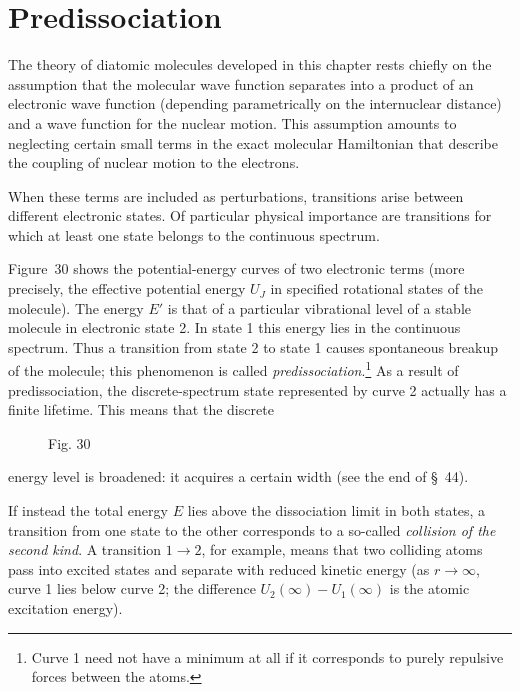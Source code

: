 \section{Predissociation}

The theory of diatomic molecules developed in this chapter rests chiefly on the assumption that the molecular wave function separates into a product of an electronic wave function (depending parametrically on the internuclear distance) and a wave function for the nuclear motion. This assumption amounts to neglecting certain small terms in the exact molecular Hamiltonian that describe the coupling of nuclear motion to the electrons.

When these terms are included as perturbations, transitions arise between different electronic states. Of particular physical importance are transitions for which at least one state belongs to the continuous spectrum.

Figure~30 shows the potential-energy curves of two electronic terms (more precisely, the effective potential energy $U_J$ in specified rotational states of the molecule). The energy $E'$ is that of a particular vibrational level of a stable molecule in electronic state 2. In state 1 this energy lies in the continuous spectrum. Thus a transition from state 2 to state 1 causes spontaneous breakup of the molecule; this phenomenon is called \emph{predissociation}.\footnote{Curve 1 need not have a minimum at all if it corresponds to purely repulsive forces between the atoms.} As a result of predissociation, the discrete-spectrum state represented by curve 2 actually has a finite lifetime. This means that the discrete

\begin{figure}[ht]
\centering
{}
\caption*{Fig. 30}
\end{figure}

energy level is broadened: it acquires a certain width (see the end of \S~44).

If instead the total energy $E$ lies above the dissociation limit in both states, a transition from one state to the other corresponds to a so-called \emph{collision of the second kind}. A transition $1\to2$, for example, means that two colliding atoms pass into excited states and separate with reduced kinetic energy (as $r\to\infty$, curve 1 lies below curve 2; the difference $U_2(\infty)-U_1(\infty)$ is the atomic excitation energy).

